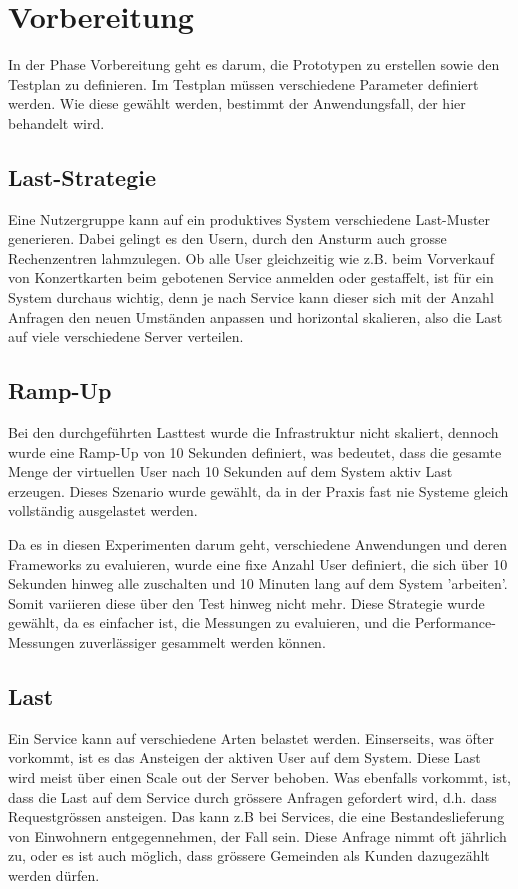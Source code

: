 \documentclass[main.tex]{subfiles}
\begin{document}
\section{Vorbereitung}
In der Phase Vorbereitung geht es darum, die Prototypen zu erstellen sowie den Testplan zu definieren. 
Im Testplan müssen verschiedene Parameter definiert werden. Wie diese gewählt werden, bestimmt der Anwendungsfall, der hier behandelt wird.

\subsection{Last-Strategie}
Eine Nutzergruppe kann auf ein produktives System verschiedene Last-Muster generieren. Dabei gelingt es den Usern, durch den Ansturm auch grosse Rechenzentren lahmzulegen. Ob alle User gleichzeitig wie z.B. beim Vorverkauf von Konzertkarten beim gebotenen Service anmelden oder gestaffelt, ist für ein System durchaus wichtig, denn je nach Service kann dieser sich mit der Anzahl Anfragen den neuen Umständen anpassen und horizontal skalieren, also die Last auf viele verschiedene Server verteilen.

\subsection{Ramp-Up}
Bei den durchgeführten Lasttest wurde die Infrastruktur nicht skaliert, dennoch wurde eine Ramp-Up von 10 Sekunden definiert, was bedeutet, dass die gesamte Menge der virtuellen User nach 10 Sekunden auf dem System aktiv Last erzeugen. Dieses Szenario wurde gewählt, da in der Praxis fast nie Systeme gleich vollständig ausgelastet werden.

Da es in diesen Experimenten darum geht, verschiedene Anwendungen und deren Frameworks zu evaluieren, wurde eine fixe Anzahl User definiert, die sich über 10 Sekunden hinweg alle zuschalten und 10 Minuten lang auf dem System 'arbeiten'. Somit variieren diese über den Test hinweg nicht mehr. Diese Strategie wurde gewählt, da es einfacher ist, die Messungen zu evaluieren, und die Performance-Messungen zuverlässiger gesammelt werden können. 

\subsection{Last}
Ein Service kann auf verschiedene Arten belastet werden. Einserseits, was öfter vorkommt, ist es das Ansteigen der aktiven User auf dem System. Diese Last wird meist über einen Scale out der Server behoben. Was ebenfalls vorkommt, ist, dass die Last auf dem Service durch grössere Anfragen gefordert wird, d.h. dass Requestgrössen ansteigen. Das kann z.B bei Services, die eine Bestandeslieferung von Einwohnern entgegennehmen, der Fall sein. Diese Anfrage nimmt oft jährlich zu, oder es ist auch möglich, dass grössere Gemeinden als Kunden dazugezählt werden dürfen. 
\end{document}
